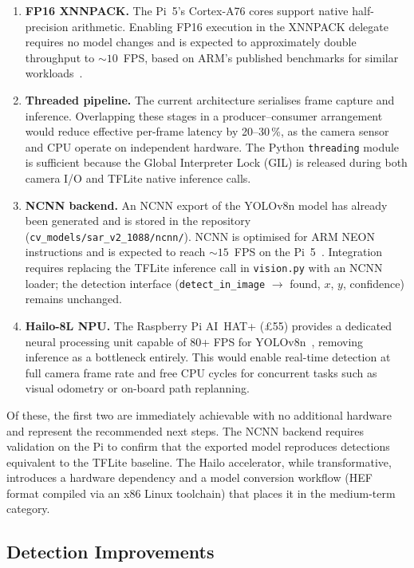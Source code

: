 \begin{enumerate}
    \item \textbf{FP16 XNNPACK.} The Pi~5's Cortex-A76 cores support native half-precision arithmetic. Enabling FP16 execution in the XNNPACK delegate requires no model changes and is expected to approximately double throughput to ${\sim}10$~FPS, based on ARM's published benchmarks for similar workloads~\cite{david2021tensorflow}.
    \item \textbf{Threaded pipeline.} The current architecture serialises frame capture and inference. Overlapping these stages in a producer--consumer arrangement would reduce effective per-frame latency by 20--30\,\%, as the camera sensor and CPU operate on independent hardware. The Python \texttt{threading} module is sufficient because the Global Interpreter Lock (GIL) is released during both camera I/O and TFLite native inference calls.
    \item \textbf{NCNN backend.} An NCNN export of the YOLOv8n model has already been generated and is stored in the repository (\texttt{cv\_models/sar\_v2\_1088/ncnn/}). NCNN is optimised for ARM NEON instructions and is expected to reach ${\sim}15$~FPS on the Pi~5~\cite{ncnn}. Integration requires replacing the TFLite inference call in \texttt{vision.py} with an NCNN loader; the detection interface (\texttt{detect\_in\_image} $\rightarrow$ found, $x$, $y$, confidence) remains unchanged.
    \item \textbf{Hailo-8L NPU.} The Raspberry Pi AI~HAT+ (\pounds55) provides a dedicated neural processing unit capable of 80+ FPS for YOLOv8n~\cite{hailo2023datasheet}, removing inference as a bottleneck entirely. This would enable real-time detection at full camera frame rate and free CPU cycles for concurrent tasks such as visual odometry or on-board path replanning.
\end{enumerate}

Of these, the first two are immediately achievable with no additional hardware and represent the recommended next steps. The NCNN backend requires validation on the Pi to confirm that the exported model reproduces detections equivalent to the TFLite baseline. The Hailo accelerator, while transformative, introduces a hardware dependency and a model conversion workflow (HEF format compiled via an x86 Linux toolchain) that places it in the medium-term category.

\subsection{Detection Improvements}\label{sec:future-detection}

